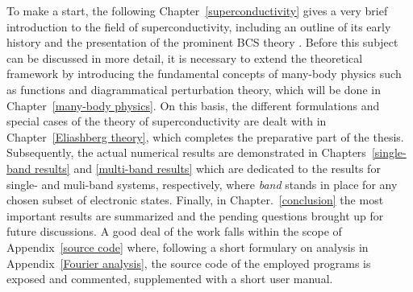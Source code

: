 To make a start, the following Chapter~\ref{superconductivity} gives a very
brief introduction to the field of superconductivity, including an outline of
its early history and the presentation of the prominent BCS theory \cites
{BardeenCooperSchrieffer57a} {BardeenCooperSchrieffer57b}. Before this subject
can be discussed in more detail, it is necessary to extend the theoretical
framework by introducing the fundamental concepts of many-body physics such as
 functions and diagrammatical perturbation theory, which will be
done in Chapter~\ref{many-body physics}. On this basis, the different
formulations and special cases of the  theory of
superconductivity are dealt with in Chapter~\ref{Eliashberg theory}, which
completes the preparative part of the thesis. Subsequently, the actual numerical
results are demonstrated in Chapters~\ref{single-band results} and
\ref{multi-band results} which are dedicated to the results for single- and
muli-band systems, respectively, where \emph{band} stands in place for any
chosen subset of electronic states. Finally, in Chapter.~\ref{conclusion} the
most important results are summarized and the pending questions brought up for
future discussions. A good deal of the work falls within the scope of
Appendix~\ref{source code} where, following a short formulary on 
analysis in Appendix~\ref{Fourier analysis}, the source code of the employed
programs is exposed and commented, supplemented with a short user manual.
